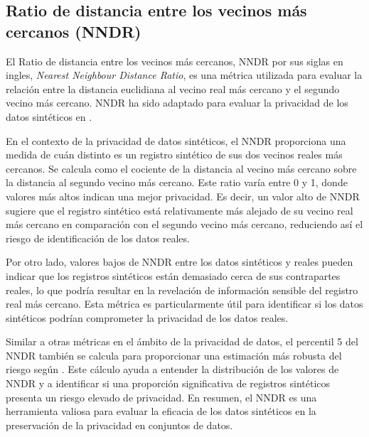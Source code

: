 \subsection{Ratio de distancia entre los vecinos más cercanos (NNDR)}
El Ratio de distancia entre los vecinos más cercanos, NNDR por sus siglas en ingles, \emph{Nearest Neighbour Distance Ratio}, es una métrica utilizada para evaluar la relación entre la distancia euclidiana al vecino real más cercano y el segundo vecino más cercano. NNDR ha sido adaptado para evaluar la privacidad de los datos sintéticos en \cite{zhao_ctab-gan_2021}.

En el contexto de la privacidad de datos sintéticos, el NNDR proporciona una medida de cuán distinto es un registro sintético de sus dos vecinos reales más cercanos. Se calcula como el cociente de la distancia al vecino más cercano sobre la distancia al segundo vecino más cercano. Este ratio varía entre 0 y 1, donde valores más altos indican una mejor privacidad. Es decir, un valor alto de NNDR sugiere que el registro sintético está relativamente más alejado de su vecino real más cercano en comparación con el segundo vecino más cercano, reduciendo así el riesgo de identificación de los datos reales.

Por otro lado, valores bajos de NNDR entre los datos sintéticos y reales pueden indicar que los registros sintéticos están demasiado cerca de sus contrapartes reales, lo que podría resultar en la revelación de información sensible del registro real más cercano. Esta métrica es particularmente útil para identificar si los datos sintéticos podrían comprometer la privacidad de los datos reales.

Similar a otras métricas en el ámbito de la privacidad de datos, el percentil 5 del NNDR también se calcula para proporcionar una estimación más robusta del riesgo según \cite{zhao_ctab-gan_2021}. Este cálculo ayuda a entender la distribución de los valores de NNDR y a identificar si una proporción significativa de registros sintéticos presenta un riesgo elevado de privacidad. En resumen, el NNDR es una herramienta valiosa para evaluar la eficacia de los datos sintéticos en la preservación de la privacidad en conjuntos de datos.


